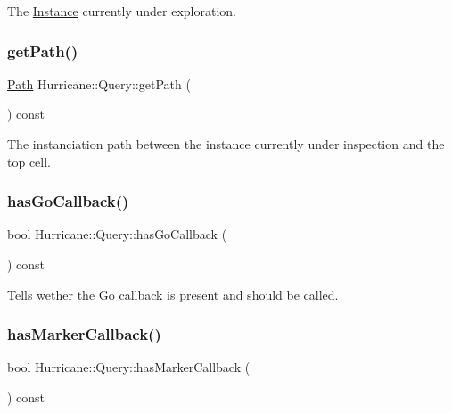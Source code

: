 The \mbox{\hyperlink{classHurricane_1_1Instance}{Instance}} currently under exploration. \mbox{\label{classHurricane_1_1Query_ae6be93b35a9174b2e7b656853f450021}} 
\subsubsection{\texorpdfstring{get\+Path()}{getPath()}}
{\footnotesize\ttfamily \mbox{\hyperlink{classHurricane_1_1Path}{Path}} Hurricane\+::\+Query\+::get\+Path (\begin{DoxyParamCaption}{ }\end{DoxyParamCaption}) const\hspace{0.3cm}{\ttfamily [inline]}}

The instanciation path between the instance currently under inspection and the top cell. \mbox{\label{classHurricane_1_1Query_aeff0c9c1ef8b787a3f1460ea55db2947}} 
\subsubsection{\texorpdfstring{has\+Go\+Callback()}{hasGoCallback()}}
{\footnotesize\ttfamily bool Hurricane\+::\+Query\+::has\+Go\+Callback (\begin{DoxyParamCaption}{ }\end{DoxyParamCaption}) const\hspace{0.3cm}{\ttfamily [virtual]}}

Tells wether the \mbox{\hyperlink{classHurricane_1_1Go}{Go}} callback is present and should be called. \mbox{\label{classHurricane_1_1Query_a4f121b05f722a661b88bb8a0dc981024}} 
\subsubsection{\texorpdfstring{has\+Marker\+Callback()}{hasMarkerCallback()}}
{\footnotesize\ttfamily bool Hurricane\+::\+Query\+::has\+Marker\+Callback (\begin{DoxyParamCaption}{ }\end{DoxyParamCaption}) const\hspace{0.3cm}{\ttfamily [virtual]}}

